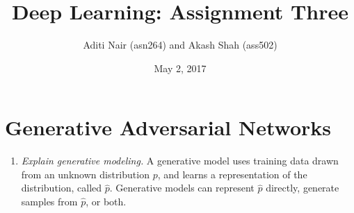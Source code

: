 \documentclass[a4paper]{article}
\title{Deep Learning: Assignment Three}
\author{Aditi Nair (asn264) and Akash Shah (ass502)}
\date{May 2, 2017}
\begin{document}
\maketitle

\section{Generative Adversarial Networks}

\begin{enumerate}
\item{\textit{Explain generative modeling.} 
\newline
\newline
A generative model uses training data drawn from an unknown distribution $p$, and learns a representation of the distribution, called $\hat{p}$. Generative models can represent $\hat{p}$ directly, generate samples from $\hat{p}$, or both. 

}
\end{enumerate}
\end{document}
